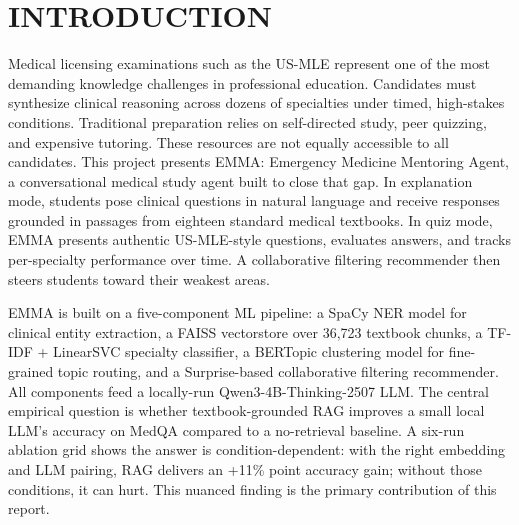 \section{INTRODUCTION}
Medical licensing examinations such as the US-MLE represent one of the most demanding knowledge challenges in professional education. Candidates must synthesize clinical reasoning across dozens of specialties under timed, high-stakes conditions. Traditional preparation relies on self-directed study, peer quizzing, and expensive tutoring. These resources are not equally accessible to all candidates. This project presents EMMA: Emergency Medicine Mentoring Agent, a conversational medical study agent built to close that gap. In explanation mode, students pose clinical questions in natural language and receive responses grounded in passages from eighteen standard medical textbooks. In quiz mode, EMMA presents authentic US-MLE-style questions, evaluates answers, and tracks per-specialty performance over time. A collaborative filtering recommender then steers students toward their weakest areas.

EMMA is built on a five-component ML pipeline: a SpaCy NER model for clinical entity extraction, a FAISS vectorstore over 36,723 textbook chunks, a TF-IDF + LinearSVC specialty classifier, a BERTopic clustering model for fine-grained topic routing, and a Surprise-based collaborative filtering recommender. All components feed a locally-run Qwen3-4B-Thinking-2507 LLM. The central empirical question is whether textbook-grounded RAG improves a small local LLM's accuracy on MedQA compared to a no-retrieval baseline. A six-run ablation grid shows the answer is condition-dependent: with the right embedding and LLM pairing, RAG delivers an +11\% point accuracy gain; without those conditions, it can hurt. This nuanced finding is the primary contribution of this report.
